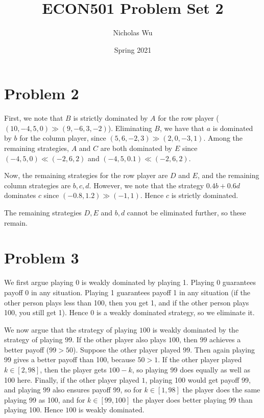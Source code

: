 \documentclass[10pt,letter]{article}
\begin{document}


\title{ECON501 Problem Set 2}

\author{Nicholas Wu}

\date{Spring 2021}

\maketitle

\section*{Problem 2}
First, we note that $B$ is strictly dominated by $A$ for the row player ($(10, -4, 5, 0) \gg (9, -6, 3, -2)$). Eliminating $B$, we have that $a$ is dominated by $b$ for the column player, since $(5, 6, -2, 3) \gg (2, 0, -3, 1)$. Among the remaining strategies, $A$ and $C$ are both dominated by $E$ since $(-4, 5, 0) \ll (-2, 6, 2)$ and $(-4, 5, 0.1) \ll (-2, 6, 2)$.

Now, the remaining strategies for the row player are $D$ and $E$, and the remaining column strategies are $b, c, d$. However, we note that the strategy $0.4b + 0.6d$ dominates $c$ since $(-0.8, 1.2) \gg (-1, 1)$. Hence $c$ is strictly dominated.

The remaining strategies $D, E$ and $b, d$ cannot be eliminated further, so these remain.

\section*{Problem 3}
We first argue playing $0$ is weakly dominated by playing 1. Playing 0 guarantees payoff 0 in any situation. Playing 1 guarantees payoff 1 in any situation (if the other person plays less than 100, then you get 1, and if the other person plays 100, you still get 1). Hence 0 is a weakly dominated strategy, so we eliminate it.

We now argue that the strategy of playing $100$ is weakly dominated by the strategy of playing $99$. If the other player also plays $100$, then $99$ achieves a better payoff ($99 > 50$). Suppose the other player played $99$. Then again playing 99 gives a better payoff than 100, because $50 > 1$. If the other player played $k \in [2, 98]$, then the player gets $100-k$, so playing 99 does equally as well as 100 here. Finally, if the other player played $1$, playing 100 would get payoff 99, and playing $99$ also ensures payoff 99, so for $k \in [1, 98]$ the player does the same playing 99 as 100, and for $k \in [99, 100]$ the player does better playing 99 than playing 100. Hence $100$ is weakly dominated.
\end{document}
